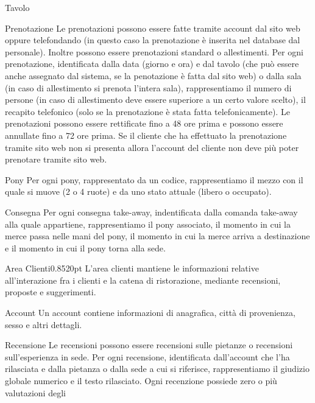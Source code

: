 \begin{center}
\begin{reqtable}{Tavolo}
\end{reqtable}
\begin{reqtable}{Prenotazione}
Le prenotazioni possono essere fatte tramite account dal sito web oppure
telefondando (in questo caso la prenotazione è inserita nel database dal personale).
Inoltre possono essere prenotazioni standard o allestimenti.
Per ogni prenotazione, identificata dalla data (giorno e ora) e dal tavolo (che
può essere anche assegnato dal sistema, se la penotazione è fatta dal sito web)
o dalla sala (in caso di allestimento si prenota l'intera sala),
rappresentiamo il numero di persone (in caso di allestimento deve essere superiore
a un certo valore scelto), il recapito telefonico (solo se la prenotazione è stata
fatta telefonicamente).
Le prenotazioni possono essere rettificate fino a 48 ore prima e possono essere
annullate fino a 72 ore prima. Se il cliente che ha effettuato la prenotazione
tramite sito web non si presenta allora l'account del cliente non deve più poter
prenotare tramite sito web.
\end{reqtable}
\begin{reqtable}{Pony}
Per ogni pony, rappresentato da un codice, rappresentiamo il mezzo con il quale
si muove (2 o 4 ruote) e da uno stato attuale (libero o occupato).
\end{reqtable}
\begin{reqtable}{Consegna}
Per ogni consegna take-away, indentificata dalla comanda take-away alla quale
appartiene, rappresentiamo il pony associato, il momento in cui la merce passa nelle
mani del pony, il momento in cui la merce arriva a destinazione e il momento in
cui il pony torna alla sede.
\end{reqtable}
\begin{reqtable}{Area Clienti}{0.85}{20pt}
L’area clienti mantiene le informazioni relative all’interazione fra i clienti e la
catena di ristorazione, mediante recensioni, proposte e suggerimenti.
\end{reqtable}
\begin{reqtable}{Account}
Un account contiene informazioni di anagrafica, città di provenienza, sesso e
altri dettagli.
\end{reqtable}
\begin{reqtable}{Recensione}
Le recensioni possono essere recensioni sulle pietanze o recensioni sull'esperienza
in sede. Per ogni recensione, identificata dall'account che l'ha rilasciata e dalla
pietanza o dalla sede a cui si riferisce, rappresentiamo il giudizio globale numerico
e il testo rilasciato. Ogni recenzione possiede zero o più valutazioni degli

\end{reqtable}
\end{center}
